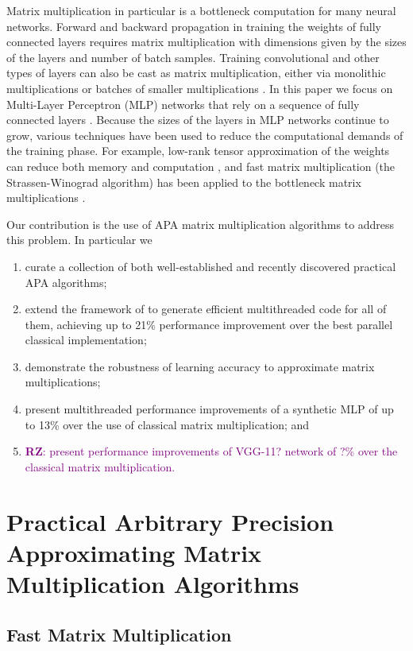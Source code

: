 \documentclass[sigconf,review,anonymous]{acmart}
\newcommand{\RZ}[1]{\textcolor{purple}{\textbf{RZ}: #1}}
\begin{document}
Matrix multiplication in particular is a bottleneck computation for many neural networks.
Forward and backward propagation in training the weights of fully connected layers requires matrix multiplication with dimensions given by the sizes of the layers and number of batch samples.
Training convolutional and other types of layers can also be cast as matrix multiplication, either via monolithic multiplications or batches of smaller multiplications \cite{CW+14,GB+19}.
In this paper we focus on Multi-Layer Perceptron (MLP) networks that rely on a sequence of fully connected layers \cite{HSW89}.
Because the sizes of the layers in MLP networks continue to grow, various techniques have been used to reduce the computational demands of the training phase.
For example, low-rank tensor approximation of the weights can reduce both memory and computation \cite{NPOV15}, and fast matrix multiplication (the Strassen-Winograd algorithm) has been applied to the bottleneck matrix multiplications \cite{KAA20}.

Our contribution is the use of APA matrix multiplication algorithms to address this problem.
In particular we
\begin{enumerate}
	\item curate a collection of both well-established and recently discovered practical APA algorithms;
	\item extend the framework of \cite{BB15} to generate efficient multithreaded code for all of them, achieving up to 21\% performance improvement over the best parallel classical implementation;
	\item demonstrate the robustness of learning accuracy to approximate matrix multiplications;
	\item present multithreaded performance improvements of a synthetic MLP of up to 13\% over the use of classical matrix multiplication; and
	\item \RZ{present performance improvements of VGG-11? network of ?\% over the classical matrix multiplication.}
\end{enumerate}

\section{Practical Arbitrary Precision Approximating Matrix Multiplication Algorithms}
\label{sec:APA}

\subsection{Fast Matrix Multiplication}
\end{document}
